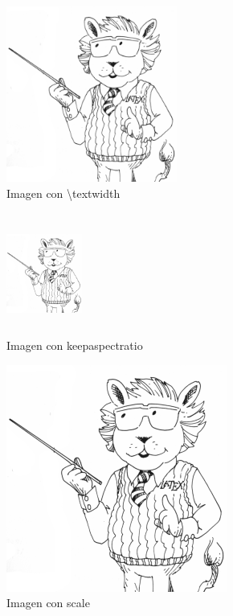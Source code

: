 \documentclass{article}
\begin{document}
\begin{figure}[H]
    \centering
    \includegraphics[width=0.5\textwidth]{images/latexlion2.png}
    \caption{Imagen con \textbackslash{}textwidth}
    \label{fig:my_label3}
\end{figure}
\begin{figure}[H]
    \centering
    \includegraphics[width=2.5cm,height=4cm,keepaspectratio]{images/latexlion2.png}
    \caption{Imagen con keepaspectratio}
    \label{fig:my_label4}
\end{figure}
\begin{figure}[H]
    \centering
    \includegraphics[scale=0.75]{images/latexlion2.png}
    \caption{Imagen con scale}
    \label{fig:my_label5}
\end{figure}
\end{document}
